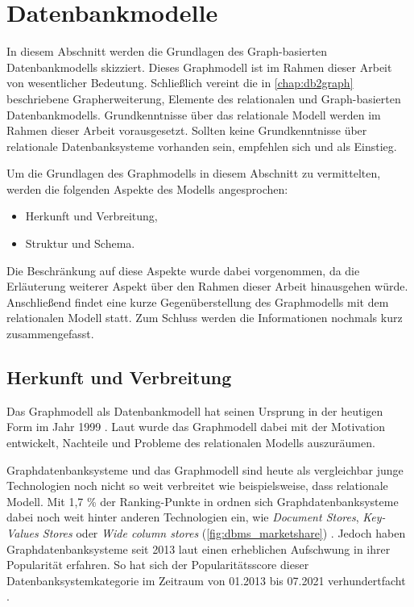 \section{Datenbankmodelle}
\label{datenmodelle}
In diesem Abschnitt werden die Grundlagen des Graph-basierten Datenbankmodells skizziert. Dieses Graphmodell ist im Rahmen dieser Arbeit von wesentlicher Bedeutung. Schließlich vereint die in \autoref{chap:db2graph} beschriebene Grapherweiterung, Elemente des relationalen und Graph-basierten Datenbankmodells. Grundkenntnisse über das relationale Modell werden im Rahmen dieser Arbeit vorausgesetzt. Sollten keine Grundkenntnisse über relationale Datenbanksysteme vorhanden sein, empfehlen sich \cite{rdbms_book} und \cite{codd_relational_model} als Einstieg.

Um die Grundlagen des Graphmodells in diesem Abschnitt zu vermittelten, werden die folgenden Aspekte des Modells angesprochen:
\begin{itemize}
    \item Herkunft und Verbreitung,
    \item Struktur und Schema.
\end{itemize}
Die Beschränkung auf diese Aspekte wurde dabei vorgenommen, da die Erläuterung weiterer Aspekt über den Rahmen dieser Arbeit hinausgehen würde. Anschließend findet eine kurze Gegenüberstellung des Graphmodells mit dem relationalen Modell statt. Zum Schluss werden die Informationen nochmals kurz zusammengefasst. 

\subsection{Herkunft und Verbreitung}
Das Graphmodell als Datenbankmodell hat seinen Ursprung in der heutigen Form im Jahr 1999 \cite{gdbms}. Laut \cite{gdbms} wurde das Graphmodell dabei mit der Motivation entwickelt, Nachteile und Probleme des relationalen Modells auszuräumen. 

Graphdatenbanksysteme und das Graphmodell sind heute als vergleichbar junge Technologien noch nicht so weit verbreitet wie beispielsweise, dass relationale Modell. Mit 1,7 \% der Ranking-Punkte in \cite{db_engines_ranking_july} ordnen sich Graphdatenbanksysteme dabei noch weit hinter anderen Technologien ein, wie \textit{Document Stores}, \textit{Key-Values Stores} oder \textit{Wide column stores} (\autoref{fig:dbms_marketshare}) \cite{db_engines_ranking_july}. Jedoch haben Graphdatenbanksysteme seit 2013 laut \cite{db_engines_ranking_july} einen erheblichen Aufschwung in ihrer Popularität erfahren. So hat sich der Popularitätsscore dieser Datenbanksystemkategorie im Zeitraum von 01.2013 bis 07.2021 verhundertfacht \cite{db_engines_ranking_july}. 

